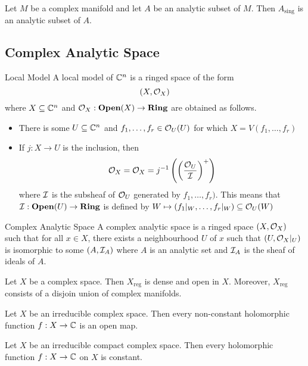 \documentclass[a4paper]{article}
\begin{document}
\begin{thm}{}{} Let $M$ be a complex manifold and let $A$ be an analytic subset of $M$. Then $A_\text{sing}$ is an analytic subset of $A$. 
\end{thm}

\subsection{Complex Analytic Space}
\begin{defn}{Local Model}{} A local model of $\mathbb{C}^n$ is a ringed space of the form $$(X,\mathcal{O}_X)$$ where $X\subseteq\mathbb{C}^n$ and $\mathcal{O}_X:\bold{Open}(X)\to\bold{Ring}$ are obtained as follows. 
\begin{itemize}
\item There is some $U\subseteq\mathbb{C}^n$ and $f_1,\dots,f_r\in\mathcal{O}_U(U)$ for which $X=V(f_1,\dots,f_r)$
\item If $j:X\to U$ is the inclusion, then $$\mathcal{O}_X=\mathcal{O}_X=j^{-1}\left(\left(\frac{\mathcal{O}_U}{\mathcal{I}}\right)^+\right)$$ where $\mathcal{I}$ is the subsheaf of $\mathcal{O}_U$ generated by $f_1,\dots,f_r)$. This means that $\mathcal{I}:\bold{Open}(U)\to\bold{Ring}$ is defined by $W\mapsto(f_1|_W,\dots,f_r|_W)\subseteq\mathcal{O}_U(W)$
\end{itemize}
\end{defn}

\begin{defn}{Complex Analytic Space}{} A complex analytic space is a ringed space $(X,\mathcal{O}_X)$ such that for all $x\in X$, there exists a neighbourhood $U$ of $x$ such that $(U,\mathcal{O}_X|_U)$ is isomorphic to some $(A,\mathcal{I}_A)$ where $A$ is an analytic set and $\mathcal{I}_A$ is the sheaf of ideals of $A$. 
\end{defn}

\begin{thm}{}{} Let $X$ be a complex space. Then $X_\text{reg}$ is dense and open in $X$. Moreover, $X_\text{reg}$ consists of a disjoin union of complex manifolds. 
\end{thm}

\begin{thm}{}{} Let $X$ be an irreducible complex space. Then every non-constant holomorphic function $f:X\to\mathbb{C}$ is an open map. 
\end{thm}

\begin{crl}{}{} Let $X$ be an irreducible compact complex space. Then every holomorphic function $f:X\to\mathbb{C}$ on $X$ is constant. 
\end{crl}
\end{document}
